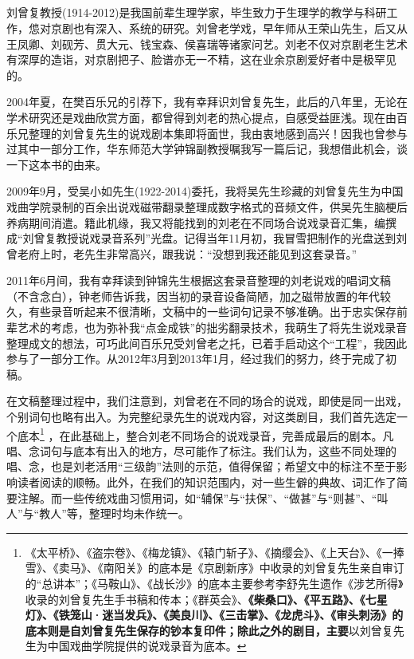 \newpage
\pagestyle{fancy}    %
\hypertarget{ux540e-ux8bb0-ux4e0e-ux81f4-ux8c22}{%
	\subsection{}\label{ux540e-ux8bb0-ux4e0e-ux81f4-ux8c22}}

刘曾复教授(1914-2012)是我国前辈生理学家，毕生致力于生理学的教学与科研工作，怹对京剧也有深入、系统的研究。刘曾老学戏，早年师从王荣山先生，后又从王凤卿、刘砚芳、贯大元、钱宝森、侯喜瑞等诸家问艺。刘老不仅对京剧老生艺术有深厚的造诣，对京剧把子、脸谱亦无一不精，这在业余京剧爱好者中是极罕见的。

2004年夏，在樊百乐兄的引荐下，我有幸拜识刘曾复先生，此后的八年里，无论在学术研究还是戏曲欣赏方面，都曾得到刘老的热心提点，自感受益匪浅。现在由百乐兄整理的刘曾复先生的说戏剧本集即将面世，我由衷地感到高兴！因我也曾参与过其中一部分工作，华东师范大学钟锦副教授嘱我写一篇后记，我想借此机会，谈一下这本书的由来。

2009年9月，受吴小如先生(1922-2014)委托，我将吴先生珍藏的刘曾复先生为中国戏曲学院录制的百余出说戏磁带翻录整理成数字格式的音频文件，供吴先生脑梗后养病期间消遣。籍此机缘，我又将能找到的刘老在不同场合说戏录音汇集，编撰成``刘曾复教授说戏录音系列''光盘。记得当年11月初，我冒雪把制作的光盘送到刘曾老府上时，老先生非常高兴，跟我说：``没想到我还能见到这套录音。''

2011年6月间，我有幸拜读到钟锦先生根据这套录音整理的刘老说戏的唱词文稿（不含念白），钟老师告诉我，因当初的录音设备简陋，加之磁带放置的年代较久，有些录音听起来不很清晰，文稿中的一些词句记录不够准确。出于忠实保存前辈艺术的考虑，也为弥补我``点金成铁''的拙劣翻录技术，我萌生了将先生说戏录音整理成文的想法，可巧此间百乐兄受刘曾老之托，已着手启动这个``工程''，我因此参与了一部分工作。从2012年3月到2013年1月，经过我们的努力，终于完成了初稿。

在文稿整理过程中，我们注意到，刘曾老在不同的场合的说戏，即使是同一出戏，个别词句也略有出入。为完整纪录先生的说戏内容，对这类剧目，我们首先选定一个底本\footnote{《太平桥》、《盗宗卷》、《梅龙镇》、《辕门斩子》、《摘缨会》、《上天台》、《一捧雪》、《卖马》、《南阳关》的底本是《京剧新序》中收录的刘曾复先生亲自审订的``总讲本''；《马鞍山》、《战长沙》的底本主要参考李舒先生遗作《涉艺所得》收录的刘曾复先生手书稿和传本；《群英会》、\textbf{《柴桑口》、《平五路》、《七星灯》、《铁笼山·迷当发兵》、《美良川》、《三击掌》、《龙虎斗》、《审头刺汤》的底本则是自刘曾复先生保存的钞本复印件；除此之外的剧目，主要}以刘曾复先生为中国戏曲学院提供的说戏录音为底本。%
}%
，在此基础上，整合刘老不同场合的说戏录音，完善成最后的剧本。凡唱、念词句与底本有出入的地方，尽可能作了标注。我们认为，这些不同处理的唱、念，也是刘老活用``三级韵''法则的示范，值得保留；希望文中的标注不至于影响读者阅读的顺畅。此外，在我们的知识范围内，对一些生僻的典故、词汇作了简要注解。而一些传统戏曲习惯用词，如``辅保''与``扶保''、``做甚''与``则甚''、``叫人''与``教人''等，整理时均未作统一。

